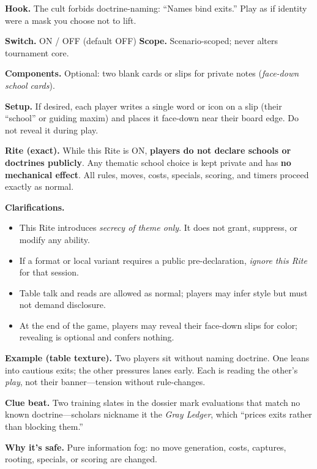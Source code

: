 \documentclass[11pt]{article}
\begin{document}
\noindent\textbf{Hook.} The cult forbids doctrine-naming: “Names bind exits.” Play as if identity were a mask you choose not to lift.

\medskip
\noindent\textbf{Switch.} \textsc{ON / OFF} (default \textsc{OFF}) \hfill \textbf{Scope.} Scenario-scoped; never alters tournament core.

\medskip
\noindent\textbf{Components.} Optional: two blank cards or slips for private notes (\emph{face-down school cards}).

\medskip
\noindent\textbf{Setup.} If desired, each player writes a single word or icon on a slip (their “school” or guiding maxim) and places it face-down near their board edge. Do not reveal it during play.

\medskip
\noindent\textbf{Rite (exact).} While this Rite is \textsc{ON}, \textbf{players do not declare schools or doctrines publicly}. Any thematic school choice is kept private and has \textbf{no mechanical effect}. All rules, moves, costs, specials, scoring, and timers proceed exactly as normal.

\medskip
\noindent\textbf{Clarifications.}
\begin{itemize}\setlength\itemsep{0.25em}
  \item This Rite introduces \emph{secrecy of theme only}. It does not grant, suppress, or modify any ability.
  \item If a format or local variant requires a public pre-declaration, \emph{ignore this Rite} for that session.
  \item Table talk and reads are allowed as normal; players may infer style but must not demand disclosure.
  \item At the end of the game, players may reveal their face-down slips for color; revealing is optional and confers nothing.
\end{itemize}

\medskip
\noindent\textbf{Example (table texture).}  
Two players sit without naming doctrine. One leans into cautious exits; the other pressures lanes early. Each is reading the other’s \emph{play}, not their banner—tension without rule-changes.

\medskip
\noindent\textbf{Clue beat.} Two training slates in the dossier mark evaluations that match no known doctrine—scholars nickname it the \emph{Gray Ledger}, which “prices exits rather than blocking them.”

\medskip
\noindent\textbf{Why it’s safe.} Pure information fog: no move generation, costs, captures, rooting, specials, or scoring are changed.
\end{document}
